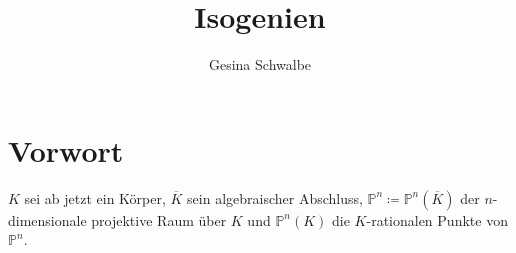\documentclass[english, german, parskip=half]{scrartcl}
\title{Isogenien}
\author{Gesina Schwalbe}
\theoremstyle{definition}
\theoremstyle{remark}
\newcommand*{\K}{\ensuremath{K}} %
\newcommand*{\algK}{\ensuremath{\overline K}} %
\renewcommand*{\P}{\ensuremath{\mathds{P}}} %
\newcommand*{\Xn}{\underline{X}} %
\DeclareMathOperator{\ord}{ord} %
\begin{document}
\maketitle
\tableofcontents

\section{Vorwort}


$\K$ sei ab jetzt ein Körper, $\algK$ sein algebraischer Abschluss, 
$\P^n\coloneqq\P^n(\algK)$ der $n$-dimensionale projektive Raum über $\K$ und
$\P^n(\K)$ die $\K$-rationalen Punkte von $\P^n$.
\end{document}
